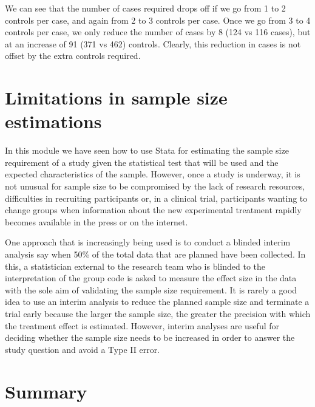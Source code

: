 \documentclass[
]{memoir}
\begin{document}
We can see that the number of cases required drops off if we go from 1 to 2 controls per case, and again from 2 to 3 controls per case. Once we go from 3 to 4 controls per case, we only reduce the number of cases by 8 (124 vs 116 cases), but at an increase of 91 (371 vs 462) controls. Clearly, this reduction in cases is not offset by the extra controls required.

\hypertarget{limitations-in-sample-size-estimations}{%
\section{Limitations in sample size estimations}\label{limitations-in-sample-size-estimations}}

In this module we have seen how to use Stata for estimating the sample size requirement of a study given the statistical test that will be used and the expected characteristics of the sample. However, once a study is underway, it is not unusual for sample size to be compromised by the lack of research resources, difficulties in recruiting participants or, in a clinical trial, participants wanting to change groups when information about the new experimental treatment rapidly becomes available in the press or on the internet.

One approach that is increasingly being used is to conduct a blinded interim analysis say when 50\% of the total data that are planned have been collected. In this, a statistician external to the research team who is blinded to the interpretation of the group code is asked to measure the effect size in the data with the sole aim of validating the sample size requirement. It is rarely a good idea to use an interim analysis to reduce the planned sample size and terminate a trial early because the larger the sample size, the greater the precision with which the treatment effect is estimated. However, interim analyses are useful for deciding whether the sample size needs to be increased in order to answer the study question and avoid a Type II error.

\hypertarget{summary-1}{%
\section{Summary}\label{summary-1}}
\end{document}
